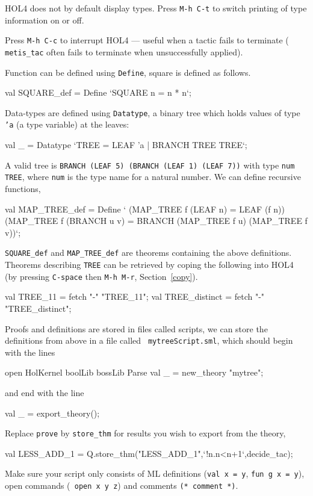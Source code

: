 \documentclass[a4paper,10pt]{article}
\begin{document}

HOL4 does not by default display types. Press {\tt M-h C-t} to switch
printing of type information on or off.


Press {\tt M-h C-c} to interrupt HOL4 --- useful when a tactic fails to terminate
(\eg{} {\tt\small metis\_tac} often fails to terminate when unsuccessfully applied).


Function can be defined using {\tt Define}, \eg{} square is defined as follows.
\begin{code}
val SQUARE_def = Define `SQUARE n = n * n`;
\end{code}

\noindent
Data-types are defined using {\tt Datatype}, \eg{} a binary tree
which holds values of type {\tt 'a} (a type variable) at the leaves:
\begin{code}
val _ = Datatype `TREE = LEAF 'a | BRANCH TREE TREE`;
\end{code}

\noindent
A valid tree is \eg{} {\tt BRANCH (LEAF 5) (BRANCH (LEAF 1) (LEAF 7))}
with type {\tt num TREE}, where {\tt  num} is the type name for a natural
number. We can define recursive functions, \eg{}
\begin{code}
val MAP_TREE_def = Define `
  (MAP_TREE f (LEAF n) = LEAF (f n)) \conj{}
  (MAP_TREE f (BRANCH u v) = BRANCH (MAP_TREE f u) (MAP_TREE f v))`;
\end{code}
{\tt  SQUARE\_def} and {\tt  MAP\_TREE\_def} are theorems containing the
above definitions. Theorems describing {\tt  TREE} can be retrieved by coping
the following into HOL4 (by pressing {\tt C-space} then {\tt M-h M-r}, Section~\ref{copy}).
\begin{code}
val TREE_11 = fetch "-" "TREE_11";
val TREE_distinct = fetch "-" "TREE_distinct";
\end{code}


Proofs and definitions are stored in files called scripts, \eg{} we
can store the definitions from above in a file called {\tt
  mytreeScript.sml}, which should begin with the lines
\begin{code}
open HolKernel boolLib bossLib Parse
val _ = new_theory "mytree";
\end{code}
and end with the line
\begin{code}
val _ = export_theory();
\end{code}
Replace {\tt prove} by {\tt store\_thm} for results you
wish to export from the theory, \eg{}
\begin{code}
val LESS_ADD_1 = Q.store_thm("LESS_ADD_1",{`}!n.n<n+1{`},decide_tac);
\end{code}
Make sure your script only consists of ML definitions ({\tt \small val
  x = y}, {\tt \small fun g x = y}), open commands ({\tt \small
  open x y z}) and comments {\tt \small (* comment *)}.
\end{document}
